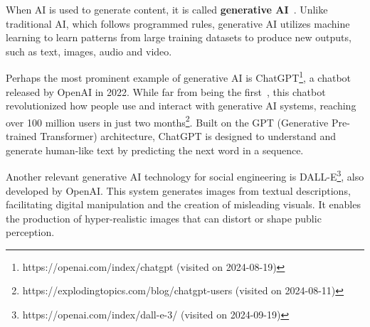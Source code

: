 When AI is used to generate content, it is called \textbf{generative AI}~\citep{goodfellow_Generative_Adversarial_Networks_2020}. Unlike traditional AI, which follows programmed rules, generative AI utilizes machine learning to learn patterns from large training datasets to produce new outputs, such as text, images, audio and video.

Perhaps the most prominent example of generative AI is ChatGPT\footnote{https://openai.com/index/chatgpt (visited on 2024-08-19)}, a chatbot released by OpenAI in 2022. While far from being the first~\citep{weizenbaum_ELIZA_1996}, this chatbot revolutionized how people use and interact with generative AI systems, reaching over 100 million users in just two months\footnote{https://explodingtopics.com/blog/chatgpt-users (visited on 2024-08-11)}. Built on the GPT (Generative Pre-trained Transformer) architecture, ChatGPT is designed to understand and generate human-like text by predicting the next word in a sequence.

Another relevant generative AI technology for social engineering is DALL-E\footnote{https://openai.com/index/dall-e-3/ (visited on 2024-09-19)}, also developed by OpenAI. This system generates images from textual descriptions, facilitating digital manipulation and the creation of misleading visuals. It enables the production of hyper-realistic images that can distort or shape public perception.

